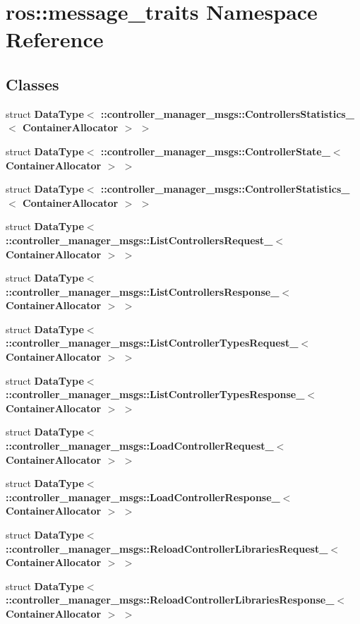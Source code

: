 \section{ros\-:\-:message\-\_\-traits \-Namespace \-Reference}
\label{namespaceros_1_1message__traits}
\subsection*{\-Classes}
\begin{DoxyCompactItemize}
\item 
struct {\bf \-Data\-Type$<$ \-::controller\-\_\-manager\-\_\-msgs\-::\-Controllers\-Statistics\-\_\-$<$ Container\-Allocator $>$ $>$}
\item 
struct {\bf \-Data\-Type$<$ \-::controller\-\_\-manager\-\_\-msgs\-::\-Controller\-State\-\_\-$<$ Container\-Allocator $>$ $>$}
\item 
struct {\bf \-Data\-Type$<$ \-::controller\-\_\-manager\-\_\-msgs\-::\-Controller\-Statistics\-\_\-$<$ Container\-Allocator $>$ $>$}
\item 
struct {\bf \-Data\-Type$<$ \-::controller\-\_\-manager\-\_\-msgs\-::\-List\-Controllers\-Request\-\_\-$<$ Container\-Allocator $>$ $>$}
\item 
struct {\bf \-Data\-Type$<$ \-::controller\-\_\-manager\-\_\-msgs\-::\-List\-Controllers\-Response\-\_\-$<$ Container\-Allocator $>$ $>$}
\item 
struct {\bf \-Data\-Type$<$ \-::controller\-\_\-manager\-\_\-msgs\-::\-List\-Controller\-Types\-Request\-\_\-$<$ Container\-Allocator $>$ $>$}
\item 
struct {\bf \-Data\-Type$<$ \-::controller\-\_\-manager\-\_\-msgs\-::\-List\-Controller\-Types\-Response\-\_\-$<$ Container\-Allocator $>$ $>$}
\item 
struct {\bf \-Data\-Type$<$ \-::controller\-\_\-manager\-\_\-msgs\-::\-Load\-Controller\-Request\-\_\-$<$ Container\-Allocator $>$ $>$}
\item 
struct {\bf \-Data\-Type$<$ \-::controller\-\_\-manager\-\_\-msgs\-::\-Load\-Controller\-Response\-\_\-$<$ Container\-Allocator $>$ $>$}
\item 
struct {\bf \-Data\-Type$<$ \-::controller\-\_\-manager\-\_\-msgs\-::\-Reload\-Controller\-Libraries\-Request\-\_\-$<$ Container\-Allocator $>$ $>$}
\item 
struct {\bf \-Data\-Type$<$ \-::controller\-\_\-manager\-\_\-msgs\-::\-Reload\-Controller\-Libraries\-Response\-\_\-$<$ Container\-Allocator $>$ $>$}

\end{DoxyCompactItemize}
